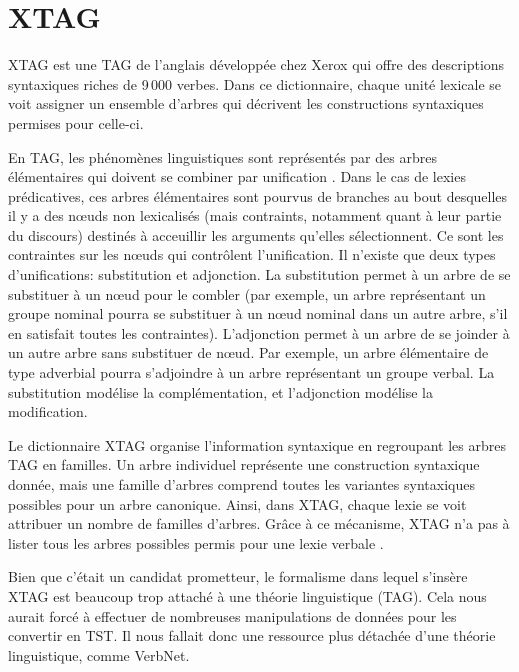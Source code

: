 \section{XTAG}

XTAG est une \ac{TAG} de l'anglais développée chez Xerox \citep{XTAGResearchGroupLexicalizedTreeAdjoining2001, ParoubekXTAGGraphicalWorkbench1992} qui offre des descriptions syntaxiques riches de 9\,000 verbes. Dans ce dictionnaire, chaque unité lexicale se voit assigner un ensemble d'arbres qui décrivent les constructions syntaxiques permises pour celle-ci.

En \ac{TAG}, les phénomènes linguistiques sont représentés par des arbres élémentaires qui doivent se combiner par unification \citep{JoshiTreeAdjoiningGrammars1997}. Dans le cas de lexies prédicatives, ces arbres élémentaires sont pourvus de branches au bout desquelles il y a des n\oe{}uds non lexicalisés (mais contraints, notamment quant à leur partie du discours) destinés à acceuillir les arguments qu'elles sélectionnent. Ce sont les contraintes sur les n\oe{}uds qui contrôlent l'unification. Il n'existe que deux types d'unifications: substitution et adjonction. La substitution permet à un arbre de se substituer à un n\oe{}ud pour le combler (par exemple, un arbre représentant un groupe nominal pourra se substituer à un n\oe{}ud nominal dans un autre arbre, s'il en satisfait toutes les contraintes). L'adjonction permet à un arbre de se joinder à un autre arbre sans substituer de n\oe{}ud. Par exemple, un arbre élémentaire de type adverbial pourra s'adjoindre à un arbre représentant un groupe verbal. La substitution modélise la complémentation, et l'adjonction modélise la modification.

Le dictionnaire XTAG organise l'information syntaxique en regroupant les arbres \ac{TAG} en familles. Un arbre individuel représente une construction syntaxique donnée, mais une famille d'arbres comprend toutes les variantes syntaxiques possibles pour un arbre canonique. Ainsi, dans XTAG, chaque lexie se voit attribuer un nombre de familles d'arbres. Grâce à ce mécanisme, XTAG n'a pas à lister tous les arbres possibles permis pour une lexie verbale \citep{DoranXTAGSystemWide1994}.

Bien que c'était un candidat prometteur, le formalisme dans lequel s'insère XTAG est beaucoup trop attaché à une théorie linguistique (\ac{TAG}). Cela nous aurait forcé à effectuer de nombreuses manipulations de données pour les convertir en \ac{TST}. Il nous fallait donc une ressource plus détachée d'une théorie linguistique, comme VerbNet.

